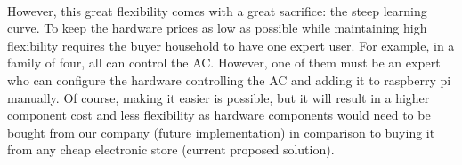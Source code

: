 \documentclass[12pt, oneside, a4paper]{book}
\begin{document}
		\paragraph{} However, this great flexibility comes with a great sacrifice: the steep learning curve. To keep the hardware prices as low as possible while maintaining high flexibility requires the buyer household to have one expert user. For example, in a family of four, all can control the AC. However, one of them must be an expert who can configure the hardware controlling the AC and adding it to raspberry pi manually. Of course, making it easier is possible, but it will result in a higher component cost and less flexibility as hardware components would need to be bought from our company (future implementation) in comparison to buying it from any cheap electronic store (current proposed solution).
\end{document}
